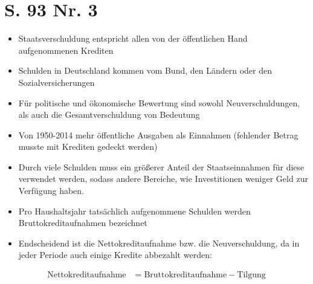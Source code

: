 \documentclass[12pt,a4paper]{report}
\begin{document}
	\section{S. 93 Nr. 3}
	\begin{itemize}
		\item Staatsverschuldung entspricht allen von der öffentlichen Hand aufgenommenen Krediten
		\item Schulden in Deutschland kommen vom Bund, den Ländern oder den Sozialversicherungen
		\item Für politische und ökonomische Bewertung sind sowohl Neuverschuldungen, als auch die Gesamtverschuldung von Bedeutung
		\item Von 1950-2014 mehr öffentliche Ausgaben als Einnahmen (fehlender Betrag musste mit Krediten gedeckt werden)
		\item Durch viele Schulden muss ein größerer Anteil der Staatseinnahmen für diese verwendet werden, sodass andere Bereiche, wie Investitionen weniger Geld zur Verfügung haben.
		\item Pro Haushaltsjahr tatsächlich aufgenommene Schulden werden Bruttokreditaufnahmen bezeichnet
		\item Endscheidend ist die Nettokreditaufnahme bzw. die Neuverschuldung, da in jeder Periode auch einige Kredite abbezahlt werden:
	\end{itemize}
	\begin{align*}
		\text{Nettokreditaufnahme} &= \text{Bruttokreditaufnahme} - \text{Tilgung}
	\end{align*}
\end{document}
